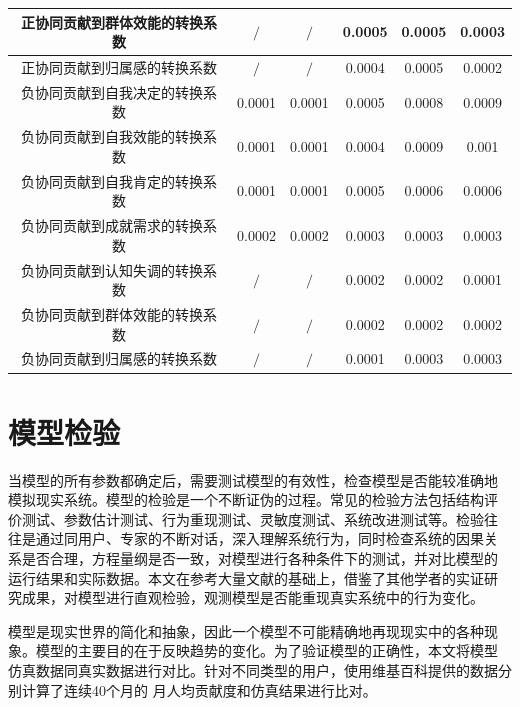 \begin{table}[!htb]
\begin{tabular}{|c|c|c|c|c|c|}
\hline
正协同贡献到群体效能的转换系数 &   $\slash$          &   $\slash$          &      0.0005      &     0.0005       &      0.0003      \\
\hline
正协同贡献到归属感的转换系数 &    $\slash$         &      $\slash$       &       0.0004     &      0.0005      &      0.0002      \\
\hline
负协同贡献到自我决定的转换系数 &     0.0001       &     0.0001       &    0.0005        &      0.0008      &     0.0009       \\
\hline
负协同贡献到自我效能的转换系数 &      0.0001      &     0.0001       &    0.0004        &      0.0009      &        0.001    \\
\hline
负协同贡献到自我肯定的转换系数 &     0.0001       &      0.0001
&0.0005&  0.0006            &  0.0006          \\
\hline
负协同贡献到成就需求的转换系数 &      0.0002      &       0.0002     &     0.0003       &       0.0003     &      0.0003      \\
\hline
负协同贡献到认知失调的转换系数 &       $\slash$      &    $\slash$         &    0.0002        &     0.0002       &     0.0001       \\
\hline
负协同贡献到群体效能的转换系数 &   $\slash$          &       $\slash$      &    0.0002        &       0.0002     &    0.0002        \\
\hline
负协同贡献到归属感的转换系数 &      $\slash$       &       $\slash$      &      0.0001      &        0.0003    &      0.0003      \\
\hline
\end{tabular}  

  
  \label{tab:initail-value-transe}
\end{table}

\section{模型检验}

当模型的所有参数都确定后，需要测试模型的有效性，检查模型是否能较准确地
模拟现实系统。模型的检验是一个不断证伪的过程。常见的检验方法包括结构评
价测试、参数估计测试、行为重现测试、灵敏度测试、系统改进测试等。检验往
往是通过同用户、专家的不断对话，深入理解系统行为，同时检查系统的因果关
系是否合理，方程量纲是否一致，对模型进行各种条件下的测试，并对比模型的
运行结果和实际数据。本文在参考大量文献的基础上，借鉴了其他学者的实证研
究成果，对模型进行直观检验，观测模型是否能重现真实系统中的行为变化。

模型是现实世界的简化和抽象，因此一个模型不可能精确地再现现实中的各种现
象。模型的主要目的在于反映趋势的变化。为了验证模型的正确性，本文将模型
仿真数据同真实数据进行对比。针对不同类型的用户，使用维基百科提供的数据分别计算了连续40个月的
月人均贡献度和仿真结果进行比对。

